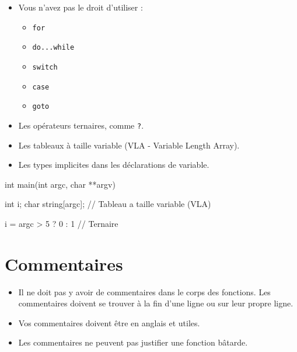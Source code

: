 \documentclass{42-fr}
\begin{document}
        \begin{itemize}

            \item Vous n’avez pas le droit d’utiliser  :

                \begin{itemize}

                    \item \texttt{for}
                    \item \texttt{do...while}
                    \item \texttt{switch}
                    \item \texttt{case}
                    \item \texttt{goto}

                \end{itemize}

            \item Les opérateurs ternaires, comme \texttt{?}.

            \item Les tableaux à taille variable (VLA - Variable Length Array).

            \item Les types implicites dans les déclarations de variable.

        \end{itemize}
        \begin{42ccode}
    int main(int argc, char **argv)
    {
        int     i;
        char    string[argc]; // Tableau a taille variable (VLA)

        i = argc > 5 ? 0 : 1 // Ternaire
    }
        \end{42ccode}
        \newpage

    \section{Commentaires}

        \begin{itemize}

            \item Il ne doit pas y avoir de commentaires dans le corps des fonctions.
                Les commentaires doivent se trouver à la fin d'une ligne ou sur leur propre ligne.

            \item Vos commentaires doivent être en anglais et utiles.

            \item Les commentaires ne peuvent pas justifier une fonction bâtarde.

        \end{itemize}
        \newpage
\end{document}
